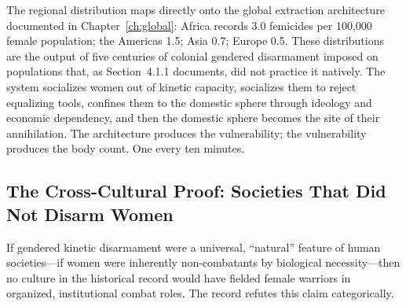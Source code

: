 The regional distribution maps directly onto the global extraction architecture documented in Chapter~\ref{ch:global}: Africa records 3.0 femicides per 100,000 female population; the Americas 1.5; Asia 0.7; Europe 0.5. These distributions are the output of five centuries of colonial gendered disarmament imposed on populations that, as Section~4.1.1 documents, did not practice it natively. The system socializes women out of kinetic capacity, socializes them to reject equalizing tools, confines them to the domestic sphere through ideology and economic dependency, and then the domestic sphere becomes the site of their annihilation. The architecture produces the vulnerability; the vulnerability produces the body count. One every ten minutes.

\subsection{The Cross-Cultural Proof: Societies That Did Not Disarm Women}

If gendered kinetic disarmament were a universal, ``natural'' feature of human societies---if women were inherently non-combatants by biological necessity---then no culture in the historical record would have fielded female warriors in organized, institutional combat roles. The record refutes this claim categorically.

